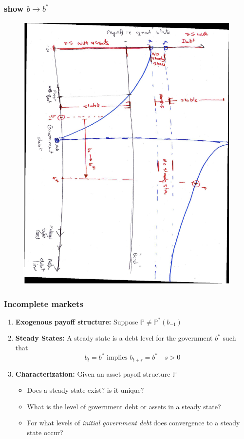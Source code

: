 \documentclass{beamer}
\begin{document}
\begin{frame}
   \frametitle{show $b\to b^*$ }
	\begin{figure}
		\begin{center}
		\includegraphics[scale=.3,angle=90]{Images/tempGraph.eps}
	\end{center}	
	\end{figure}

  \end{frame}
 
% 
\begin{frame}
	\frametitle{Incomplete markets }
	\begin{enumerate}
		\item  \textbf{Exogenous payoff structure:} Suppose $\mathbb{P}\neq \mathbb{P}^*(b_{-1})$
		
		\item \textbf{Steady States: } A steady state is a debt level for the government $b^*$ such that 
		\[b_{t}=b^* \text{ implies } b_{t+s}=b^*\quad s>0\]
	
			
		\item \textbf{Characterization: } Given an asset payoff structure $\mathbb{P}$
		\begin{itemize}
			\item Does a steady state exist? is it unique?
			\item What is the level of government debt or   assets in a steady state?
			\item For what levels of  \emph{initial government debt} does  convergence to a steady state occur?
 			\end{itemize}
	\end{enumerate}
\end{frame}
\end{document}
